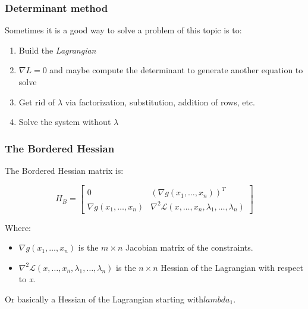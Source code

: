 \subsubsection{Determinant method}

Sometimes it is a good way to solve a problem of this topic is to:

\begin{enumerate}
    
    \item Build the \emph{Lagrangian}
    
    \item \(\nabla L = 0\) and maybe compute the determinant to generate another equation to solve
    
    
    \item Get rid of \(\lambda\) via factorization, substitution, addition of rows, etc.
    
    \item Solve the system without \(\lambda\)

\end{enumerate}

\subsubsection{The Bordered Hessian}

The Bordered Hessian matrix is:

\[
    H_B =
    \begin{bmatrix}
    0 & {\left( \nabla g(x_1, \dots, x_n) \right)}^T \\
    \nabla g(x_1, \dots, x_n) & \nabla^2 \mathcal{L}(x, \dots, x_n, \lambda_1, \dots, \lambda_n)
    \end{bmatrix}
\]

Where:

\begin{itemize}

    \item \( \nabla  g(x_1, \dots, x_n) \) is the \( m \times n \) Jacobian matrix of the constraints.

    \item \( \nabla^2 \mathcal{L}(x, \dots, x_n, \lambda_1, \dots, \lambda_n) \) is the \( n \times n \) 
          Hessian of the Lagrangian with respect to \emph{x}.

\end{itemize}

Or basically a Hessian of the Lagrangian starting with\(lambda_1\).
\vspace{\baselineskip}

